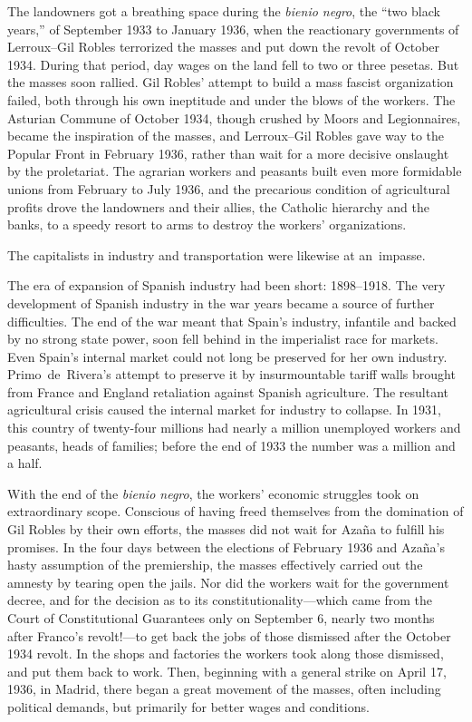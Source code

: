 The landowners got a breathing space during the \emph{bienio negro}{\indexbienionegro}, the ``two black years,'' of September 1933 to January 1936, when the reactionary governments of Lerroux--Gil Robles{\indexALerroux\indexGRobles} terrorized the masses and put down the revolt of October 1934. During that period, day wages on the land fell to two or three pesetas. But the masses soon rallied. Gil Robles’ attempt to build a mass fascist organization failed, both through his own ineptitude and under the blows of the workers. The Asturian Commune of October 1934, though crushed by Moors and Legionnaires, became the inspiration of the masses, and Lerroux--Gil Robles gave way to the Popular Front in February 1936, rather than wait for a more decisive onslaught by the proletariat. The agrarian workers and peasants built even more formidable unions from February to July 1936, and the precarious condition of agricultural profits drove the landowners and their allies, the Catholic hierarchy and the banks, to a speedy resort to arms to destroy the workers’ organizations.

\dinkus

The capitalists in industry and transportation were likewise at an~impasse.

The era of expansion of Spanish industry had been short: 1898--1918. The very development of Spanish industry in the war years became a source of further difficulties. The end of the war meant that Spain’s industry, infantile and backed by no strong state power, soon fell behind in the imperialist race for markets. Even Spain’s internal market could not long be preserved for her own industry. Primo~de~Rivera’s attempt to preserve it by insurmountable tariff walls brought from France and England retaliation against Spanish agriculture. The resultant agricultural crisis caused the internal market for industry to collapse. In 1931, this country of twenty-four millions had nearly a million unemployed workers and peasants, heads of families; before the end of 1933 the number was a million and a half.

With the end of the \emph{bienio negro}, the workers’ economic struggles took on extraordinary scope. Conscious of having freed themselves from the domination of Gil Robles by their own efforts, the masses did not wait for Azaña to fulfill his promises. In the four days between the elections of February 1936 and Azaña’s hasty assumption of the premiership, the masses effectively carried out the amnesty by tearing open the jails. Nor did the workers wait for the government decree, and for the decision as to its constitutionality---which came from the Court of Constitutional Guarantees only on September 6, nearly two months after Franco’s revolt!---to get back the jobs of those dismissed after the October 1934 revolt. In the shops and factories the workers took along those dismissed, and put them back to work. Then, beginning with a general strike on April 17, 1936, in Madrid, there began a great movement of the masses, often including political demands, but primarily for better wages and conditions.

